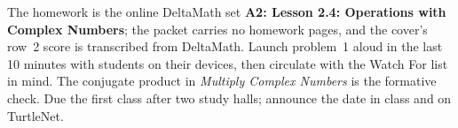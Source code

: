 \documentclass[10pt]{article}
\begin{document}
\begin{teachernote}[Homework]
The homework is the online DeltaMath set \textbf{A2: Lesson 2.4: Operations with Complex
Numbers}; the packet carries no homework pages, and the cover's row~2 score is transcribed from
DeltaMath. Launch problem~1 aloud in the last 10 minutes with students on their devices, then
circulate with the Watch For list in mind. The conjugate product in \emph{Multiply Complex
Numbers} is the formative check. Due the first class after two study halls; announce the date in
class and on TurtleNet.
\end{teachernote}
\end{document}
